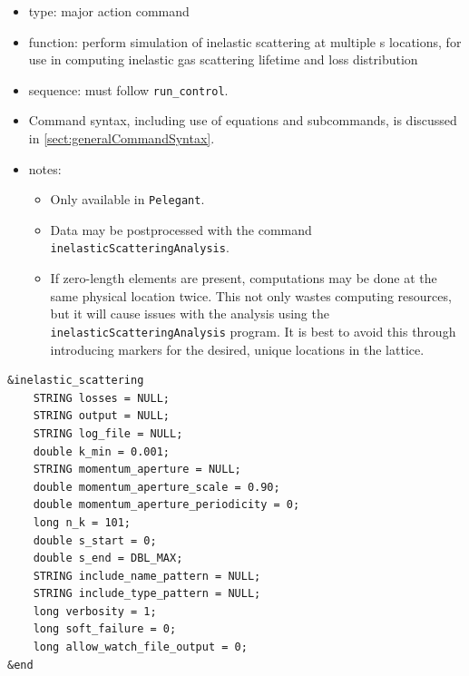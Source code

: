 \documentclass[11pt]{article}
\begin{document}
\begin{itemize}
\item type: major action command
\item function: perform simulation of inelastic scattering at multiple s locations, for
  use in computing inelastic gas scattering lifetime and loss distribution
\item sequence: must follow \verb|run_control|.
\item Command syntax, including use of equations and subcommands, is discussed in \ref{sect:generalCommandSyntax}.
\item notes: 
  \begin{itemize} 
    \item Only available in \verb|Pelegant|.
    \item Data may be postprocessed with the command \verb|inelasticScatteringAnalysis|.
    \item If zero-length elements are present, computations may be done at the same physical location twice. 
      This not only wastes computing resources, but it will cause issues with the analysis using the
      \verb|inelasticScatteringAnalysis| program. It is best to avoid this through introducing markers for
      the desired, unique locations in the lattice.
    \end{itemize}
\end{itemize}

\begin{verbatim}
&inelastic_scattering
    STRING losses = NULL;
    STRING output = NULL;
    STRING log_file = NULL;
    double k_min = 0.001;
    STRING momentum_aperture = NULL;
    double momentum_aperture_scale = 0.90;
    double momentum_aperture_periodicity = 0;
    long n_k = 101;
    double s_start = 0;
    double s_end = DBL_MAX;
    STRING include_name_pattern = NULL;
    STRING include_type_pattern = NULL;
    long verbosity = 1;        
    long soft_failure = 0;
    long allow_watch_file_output = 0;
&end
\end{verbatim}
\end{document}
